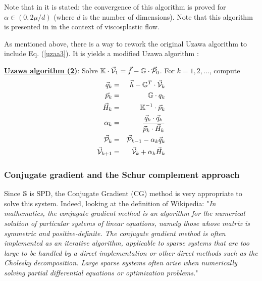 Note that in \cite{glow} it is stated: the convergence of this algorithm is proved for 
$\alpha \in (0,2\mu/d)$ (where $d$ is the number of dimensions).
Note that this algorithm is presented in \cite{zivt85} in the context of viscosplastic flow.


As mentioned above, there is a way to rework the original Uzawa algorithm 
to include Eq. (\ref{uzaa3}). It is yields a modified 
Uzawa algorithm \cite[p221]{braess}:


\begin{mdframed}[backgroundcolor=blue!5]
\underline{\bf Uzawa algorithm (2)}:
Solve $\mathbb{K}\cdot \vec{\cal V}_1 = \vec f - \mathbb{G}\cdot  \vec{\cal P}_0$. 
For $k=1,2,...$, compute 
\begin{eqnarray}
\vec q_k &=& \vec h-\mathbb{G}^T \cdot \vec{\cal V}_k \\
\vec{p}_k &=& {{\mathbb{G}}}\cdot q_k \\
\vec H_k &=& {{\mathbb{K}}}^{-1}\cdot \vec{p}_k \\
\alpha_k &=& \frac{\vec q_k \cdot \vec q_k}{\vec{p}_k \cdot \vec H_k} \\
\vec {\cal P}_k &=& \vec {\cal P}_{k-1} - \alpha_k  \vec q_k \\
\vec {\cal V}_{k+1} &=& \vec {\cal V}_k + \alpha_k  \vec H_k
\end{eqnarray}
\end{mdframed}























\subsubsection{Conjugate gradient and the Schur complement approach }


 
Since ${\mathbb{S}}$ is SPD, the Conjugate Gradient (CG) method is very appropriate to solve this system. 
Indeed, looking at the definition of Wikipedia: "{\it In mathematics, the conjugate gradient method is an algorithm for the numerical solution of particular systems of linear equations, namely those whose matrix is symmetric and positive-definite. The conjugate gradient method is often implemented as an iterative algorithm, applicable to sparse systems that are too large to be handled by a direct implementation or other direct methods such as the Cholesky decomposition. Large sparse systems often arise when numerically solving partial differential equations or optimization problems.}"

